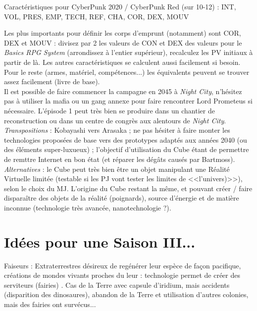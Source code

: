 \documentclass[11pt,twoside,a4paper]{book}
\begin{document}
Caract{\'e}ristiques pour CyberPunk 2020 / CyberPunk Red (sur 10-12) : INT, VOL, PRES, EMP, TECH, REF, CHA, COR, DEX, MOUV

Les plus importants pour d{\'e}finir les corps d'emprunt (notamment) sont COR, DEX et MOUV : divisez par 2 les valeurs de CON et DEX des valeurs pour le \emph{Basics RPG System} (arrondissez {\`a} l'entier sup{\'e}rieur), recalculez les PV initiaux {\`a} partir de l{\`a}. Les autres caract{\'e}ristiques se calculent aussi facilement si besoin. Pour le reste (armes, mat{\'e}riel, comp{\'e}tences...) les {\'e}quivalents peuvent se trouver assez facilement (livre de base).~\\

Il est possible de faire commencer la campagne en 2045 {\`a} \emph{Night City}, n'h{\'e}sitez pas {\`a} utiliser la mafia ou un gang annexe pour faire rencontrer Lord Prometeus si n{\'e}cessaire. L'{\'e}pisode 1 peut tr{\`e}s bien se produire dans un chantier de reconstruction ou dans un centre de congr{\`e}s aux alentours de \emph{Night City}.~\\

\emph{Transpositions} : Kobayashi vers Arasaka ; ne pas h{\'e}siter {\`a} faire monter les technologies propos{\'e}es de base vers des prototypes adapt{\'e}s aux ann{\'e}es 2040 (ou des {\'e}l{\'e}ments super-luxueux) ; l'objectif d'utilisation du Cube {\'e}tant de permettre de remttre Internet en bon {\'e}tat (et r{\'e}parer les d{\'e}g{\^a}ts caus{\'e}s par Bartmoss).~\\
 
\emph{Alternatives} : le Cube peut tr{\`e}s bien {\^e}tre un objet manipulant une R{\'e}alit{\'e} Virtuelle limit{\'e}e (testable si les PJ vont tester les limites de <<l'univers)>>), selon le choix du MJ. L'origine du Cube restant la m{\^e}me, et pouvant cr{\'e}er / faire dispara{\^i}tre des objets de la r{\'e}alit{\'e} (poignards), source d'{\'e}nergie et de mati{\`e}re inconnue (technologie tr{\`e}s avanc{\'e}e, nanotechnologie ?). 

\dotfill

\clearpage

\section*{Id{\'e}es pour une Saison III...}

Faiseurs : Extraterrestres d{\'e}sireux de reg{\'e}n{\'e}rer leur esp{\`e}ce de fa\c{c}on pacifique, cr{\'e}ations de mondes vivants proches du leur : technologie permet de cr{\'e}er des serviteurs (fairies) . Cas de la Terre avec capsule d'iridium, mais accidents (disparition des dinosaures), abandon de la Terre et utilisation d'autres colonies, mais des fairies ont surv{\'e}cus... ~\\
\end{document}
